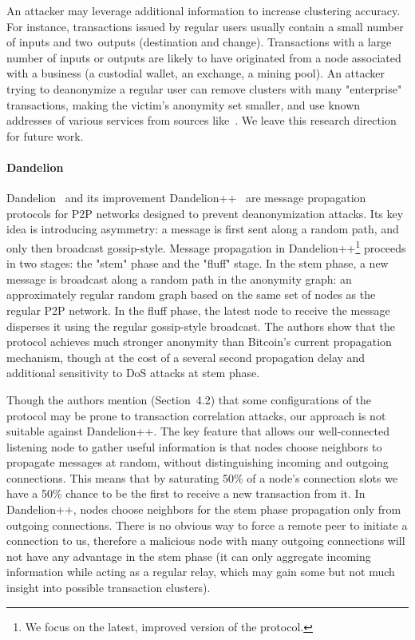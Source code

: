 An attacker may leverage additional information to increase clustering accuracy.
For instance, transactions issued by regular users usually contain a small number of inputs and two~outputs (destination and change).
Transactions with a large number of inputs or outputs are likely to have originated from a node associated with a business (a custodial wallet, an exchange, a mining pool).
An attacker trying to deanonymize a regular user can remove clusters with many "enterprise" transactions, making the victim's anonymity set smaller, and use known addresses of various services from sources like~\cite{Walletexplorer}.
We leave this research direction for future work.

\paragraph{Dandelion}

Dandelion~\cite{Venkatakrishnan2017} and its improvement Dandelion++~\cite{Fanti2018} are message propagation protocols for P2P networks designed to prevent deanonymization attacks.
Its key idea is introducing asymmetry: a message is first sent along a random path, and only then broadcast gossip-style.
Message propagation in Dandelion++\footnote{We focus on the latest, improved version of the protocol.} proceeds in two stages: the "stem" phase and the "fluff" stage.
In the stem phase, a new message is broadcast along a random path in the anonymity graph: an approximately regular random graph based on the same set of nodes as the regular P2P network.
In the fluff phase, the latest node to receive the message disperses it using the regular gossip-style broadcast.
The authors show that the protocol achieves much stronger anonymity than Bitcoin's current propagation mechanism, though at the cost of a several second propagation delay and additional sensitivity to DoS attacks at stem phase. 

Though the authors mention (Section~4.2) that some configurations of the protocol may be prone to transaction  correlation attacks, our approach is not suitable against Dandelion++.
The key feature that allows our well-connected listening node to gather useful information is that nodes choose neighbors to propagate messages at random, without distinguishing incoming and outgoing connections.
This means that by saturating 50\% of a node's connection slots we have a 50\% chance to be the first to receive a new transaction from it.
In Dandelion++, nodes choose neighbors for the stem phase propagation only from outgoing connections.
There is no obvious way to force a remote peer to initiate a connection to us, therefore a malicious node with many outgoing connections will not have any advantage in the stem phase (it can only aggregate incoming information while acting as a regular relay, which may gain some but not much insight into possible transaction clusters).


